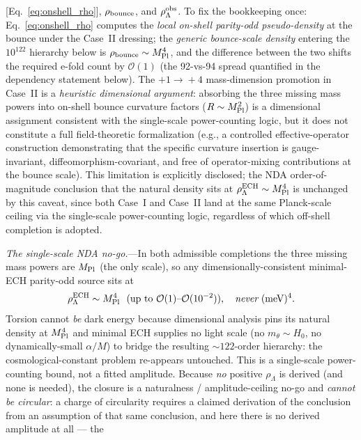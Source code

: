 \documentclass[aps,prd,twocolumn,superscriptaddress,showpacs,preprintnumbers,nofootinbib,longbibliography,floatfix]{revtex4-2}
\newcommand{\MPl}{M_{\rm Pl}}
\begin{document}
[Eq.~\eqref{eq:onshell_rho}], $\rho_{\rm bounce}$, and
$\rho_\Lambda^{\rm obs}$.
To fix the bookkeeping once: Eq.~\eqref{eq:onshell_rho} computes the
\emph{local on-shell parity-odd pseudo-density} at the bounce under the
Case~II dressing; the \emph{generic bounce-scale density} entering the
$10^{122}$ hierarchy below is $\rho_{\rm bounce}\sim\MPl^{4}$, and the
difference between the two shifts the required e-fold count by
$\mathcal{O}(1)$ (the 92-vs-94 spread quantified in the dependency
statement below).
The $+1\!\to\!+4$ mass-dimension promotion in Case~II is a
\emph{heuristic dimensional argument}: absorbing the three missing mass powers
into on-shell bounce curvature factors ($R\sim\MPl^2$) is a
dimensional assignment consistent with the single-scale power-counting logic,
but it does not constitute a full field-theoretic formalization (e.g.,
a controlled effective-operator construction demonstrating that the specific
curvature insertion is gauge-invariant, diffeomorphism-covariant, and free of
operator-mixing contributions at the bounce scale). This limitation is
explicitly disclosed; the NDA order-of-magnitude conclusion that the
natural density sits at $\rho_\Lambda^{\rm ECH}\sim\MPl^4$ is unchanged by
this caveat, since both Case~I and Case~II land at the same Planck-scale
ceiling via the single-scale power-counting logic, regardless of which
off-shell completion is adopted.
\par
\textit{The single-scale NDA no-go.}---In both admissible completions the
three missing mass powers are $\MPl$ (the only scale), so any
dimensionally-consistent minimal-ECH parity-odd source sits at
\begin{equation}
\rho_\Lambda^{\rm ECH}\sim\MPl^{4}\ \ (\text{up to }\mathcal{O}(1)\text{--}\mathcal{O}(10^{-2})),
\quad \emph{never}\ (\text{meV})^{4}.
\end{equation}
Torsion cannot \emph{be} dark energy because dimensional analysis pins its
natural density at $\MPl^{4}$ and minimal ECH supplies no light scale (no
$m_\theta\!\sim\!H_0$, no dynamically-small $\alpha/M$) to bridge the
resulting $\sim\!122$-order hierarchy: the cosmological-constant problem
re-appears untouched. This is a single-scale power-counting bound, not a
fitted amplitude. Because \emph{no} positive $\rho_\Lambda$ is derived
(and none is needed), the closure is a naturalness / amplitude-ceiling
no-go and \emph{cannot be circular}: a charge of circularity requires a
claimed derivation of the conclusion from an assumption of that same
conclusion, and here there is no derived amplitude at all --- the
\end{document}
